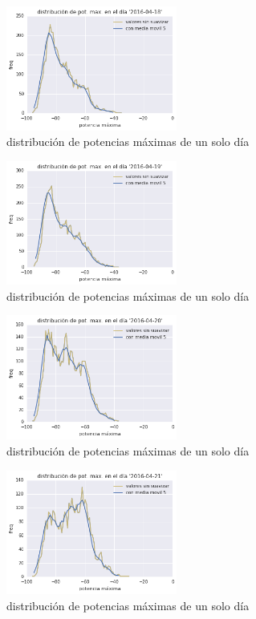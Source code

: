 \documentclass[12pt]{article}
\begin{document}
\begin{figure}[H] 
  \centering
  \includegraphics[width=0.5\textwidth]{../pot_max_2016-04-18.png}
  \caption{distribución de potencias máximas de un solo día}
\end{figure}

\begin{figure}[H] 
  \centering
  \includegraphics[width=0.5\textwidth]{../pot_max_2016-04-19.png}
  \caption{distribución de potencias máximas de un solo día}
\end{figure}

\begin{figure}[H] 
  \centering
  \includegraphics[width=0.5\textwidth]{../pot_max_2016-04-20.png}
  \caption{distribución de potencias máximas de un solo día}
\end{figure}

\begin{figure}[H] 
  \centering
  \includegraphics[width=0.5\textwidth]{../pot_max_2016-04-21.png}
  \caption{distribución de potencias máximas de un solo día}
\end{figure}
\end{document}
